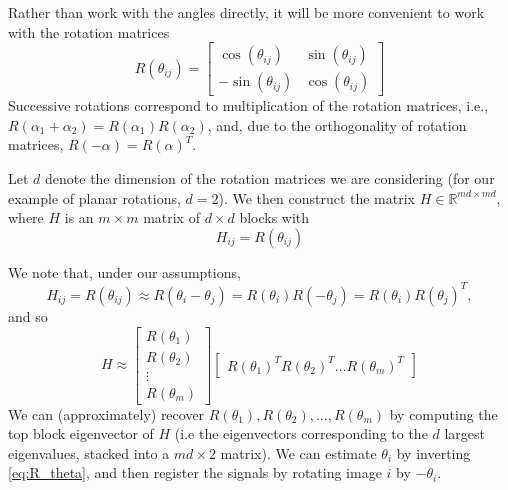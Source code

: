 \documentclass[11pt]{article}
\begin{document}
Rather than work with the angles directly, it will be more convenient to work with the rotation matrices 
\begin{equation} \label{eq:R_theta}
R(\theta_{ij}) = \begin{bmatrix}
\cos(\theta_{ij}) & \sin(\theta_{ij}) \\
-\sin(\theta_{ij}) & \cos(\theta_{ij})
\end{bmatrix}
\end{equation}
%
Successive rotations correspond to multiplication of the rotation matrices, i.e., 
$R(\alpha_1 + \alpha_2) = R(\alpha_1) R(\alpha_2)$,
and, due to the orthogonality of rotation matrices, $R(-\alpha) = R(\alpha)^T$.

Let $d$ denote the dimension of the rotation matrices we are considering (for our example of planar rotations, $d=2$).
%
 We then construct the matrix $H \in \mathbb{R}^{md \times md}$, where $H$ is an $m \times m$ matrix of $d \times d$ blocks with
\begin{equation} \label{eq:H_to_R}
H_{ij} = R(\theta_{ij})
\end{equation}
%

We note that, under our assumptions, 
\begin{equation} 
H_{ij} = R(\theta_{ij}) \approx R(\theta_i - \theta_j) = R(\theta_i) R(-\theta_j) = R(\theta_i) R(\theta_j)^T,
\end{equation}
 and so
\begin{equation} \label{eq:H_low_rank}
	H \approx 
	\begin{bmatrix}
	R(\theta_1) \\
	R(\theta_2) \\
	\vdots \\
	R(\theta_m)
	\end{bmatrix}
	\begin{bmatrix}
	R(\theta_1)^T R(\theta_2)^T \dots R(\theta_m)^T
	\end{bmatrix}
\end{equation}
%
We can (approximately) recover $R(\theta_1), R(\theta_2), \dots, R(\theta_m)$ by computing the top block eigenvector of $H$ (i.e the eigenvectors corresponding to the $d$ largest eigenvalues, stacked into a $md \times 2$ matrix).
%
We can estimate $\theta_{i}$ by inverting \eqref{eq:R_theta}, and then register the signals by rotating image $i$ by $-\theta_i$. 
\end{document}

